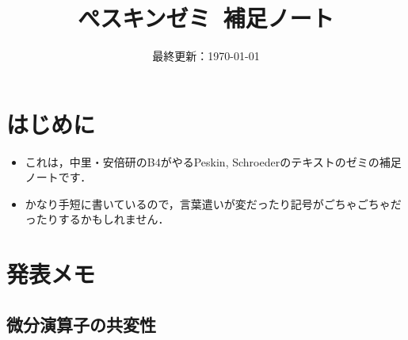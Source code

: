 \documentclass[a4paper,pdflatex,ja=standard]{bxjsarticle}
\title{ぺスキンゼミ\ 補足ノート}
\author{\empty}
\date{最終更新：\today}
\begin{document}
\maketitle

\section*{はじめに}

\begin{itemize}
  \item 
  これは，中里・安倍研のB4がやるPeskin, Schroederのテキスト\cite{peskin}のゼミの補足ノートです．

  \item 
  かなり手短に書いているので，言葉遣いが変だったり記号がごちゃごちゃだったりするかもしれません．

\end{itemize}

\tableofcontents
\clearpage

\section{発表メモ}

\subsection{微分演算子の共変性}
\end{document}
